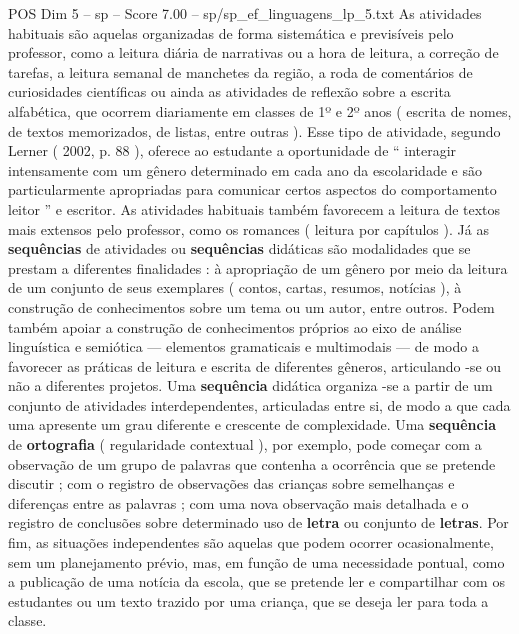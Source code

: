 \begin{textsample}{POS Dim 5 – sp – Score 7.00 – sp/sp\_ef\_linguagens\_lp\_5.txt}  \label{ex:f5_pos_073}
As atividades habituais são aquelas organizadas de forma sistemática e previsíveis pelo professor, como a leitura diária de narrativas ou a hora de leitura, a correção de tarefas, a leitura semanal de manchetes da região, a roda de comentários de curiosidades científicas ou ainda as atividades de reflexão sobre a escrita alfabética, que ocorrem diariamente em classes de 1º e 2º anos ( escrita de nomes, de textos memorizados, de listas, entre outras ).
Esse tipo de atividade, segundo Lerner ( 2002, p. 88 ), oferece ao estudante a oportunidade de “ interagir intensamente com um gênero determinado em cada ano da escolaridade e são particularmente apropriadas para comunicar certos aspectos do comportamento leitor ” e escritor.
As atividades habituais também favorecem a leitura de textos mais extensos pelo professor, como os romances ( leitura por capítulos ).
Já as \textbf{sequências} de atividades ou \textbf{sequências} didáticas são modalidades que se prestam a diferentes finalidades : à apropriação de um gênero por meio da leitura de um conjunto de seus exemplares ( contos, cartas, resumos, notícias ), à construção de conhecimentos sobre um tema ou um autor, entre outros.
Podem também apoiar a construção de conhecimentos próprios ao eixo de análise linguística e semiótica — elementos gramaticais e multimodais — de modo a favorecer as práticas de leitura e escrita de diferentes gêneros, articulando -se ou não a diferentes projetos.
Uma \textbf{sequência} didática organiza -se a partir de um conjunto de atividades interdependentes, articuladas entre si, de modo a que cada uma apresente um grau diferente e crescente de complexidade.
Uma \textbf{sequência} de \textbf{ortografia} ( regularidade contextual ), por exemplo, pode começar com a observação de um grupo de palavras que contenha a ocorrência que se pretende discutir ; com o registro de observações das crianças sobre semelhanças e diferenças entre as palavras ; com uma nova observação mais detalhada e o registro de conclusões sobre determinado uso de \textbf{letra} ou conjunto de \textbf{letras}.
Por fim, as situações independentes são aquelas que podem ocorrer ocasionalmente, sem um planejamento prévio, mas, em função de uma necessidade pontual, como a publicação de uma notícia da escola, que se pretende ler e compartilhar com os estudantes ou um texto trazido por uma criança, que se deseja ler para toda a classe.

\end{textsample}
